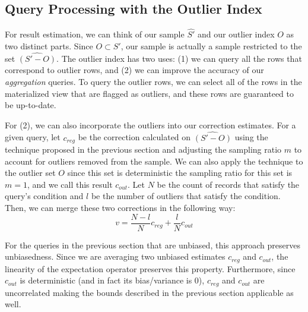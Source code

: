 \subsection{Query Processing with the Outlier Index} 
For result estimation, we can think of our sample $\hat{S'}$ and our outlier index $O$ as two distinct parts.
Since $O \subset S'$, our sample is actually a sample restricted to the set $\hat{(S'-O)}$.
The outlier index has two uses: (1) we can query all the rows that correspond to outlier rows, 
and (2) we can improve the accuracy of our \emph{aggregation} queries.
To query the outlier rows, we can select all of the rows in the materialized view that are flagged as outliers, and these rows are guaranteed to be up-to-date.

For (2), we can also incorporate the outliers into our correction estimates.  
For a given query, let $c_{reg}$ be the correction calculated on $\hat{(S'-O)}$ using the technique proposed in the previous section and adjusting the sampling ratio $m$ to account for outliers removed from the sample.
We can also apply the technique to the outlier set $O$ since this set is deterministic the sampling ratio for this set is $m=1$, and we call this result $c_{out}$.
Let $N$ be the count of records that satisfy the query's condition and $l$ be the number of outliers that satisfy the condition.
Then, we can merge these two corrections in the following way:
\[
 v = \frac{N-l}{N}c_{reg} + \frac{l}{N}c_{out}
\]

For the queries in the previous section that are unbiased, this approach preserves unbiasedness.
Since we are averaging two unbiased estimates $c_{reg}$ and $c_{out}$, the linearity of the expectation operator preserves this property.
Furthermore, since $c_{out}$ is deterministic (and in fact its bias/variance is 0), $c_{reg}$ and $c_{out}$ are uncorrelated making the bounds described in the previous section applicable as well.

